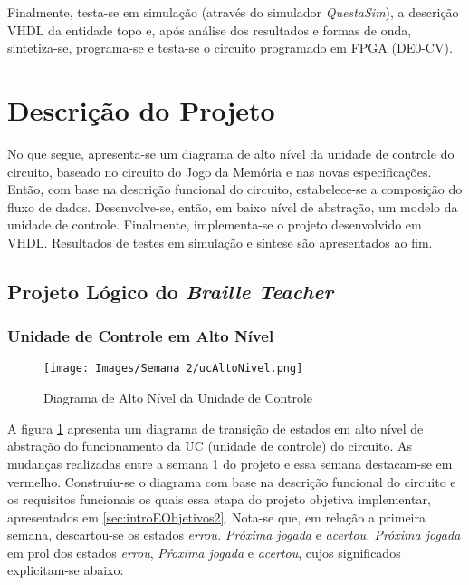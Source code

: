 \documentclass[amsmath,amssymb,floatfix]{report}
\begin{document}
Finalmente, testa-se em simulação (através do simulador \textit{QuestaSim}), a descrição VHDL da entidade topo e, após análise dos resultados e formas de onda, sintetiza-se, programa-se e testa-se o circuito programado em FPGA (DE0-CV).


\section{Descrição do Projeto}
\label{sec:descricaoDoProjeto2}

No que segue, apresenta-se um diagrama de alto nível da unidade de controle do circuito, baseado no circuito do Jogo da Memória e nas novas especificações. Então, com base na descrição funcional do circuito, estabelece-se a composição do fluxo de dados. Desenvolve-se, então, em baixo nível de abstração, um modelo da unidade de controle. Finalmente, implementa-se o projeto desenvolvido em VHDL. Resultados de testes em simulação e síntese são apresentados ao fim.

\subsection{Projeto Lógico do \textit{Braille Teacher}}
\label{subsec:projetoLogico2}

\subsubsection{Unidade de Controle em Alto Nível}
\label{subsubsec:ucAltoNivel2}

\begin{figure}[H]
    \centering
    \texttt{[image: Images/Semana 2/ucAltoNivel.png]}
    \caption{Diagrama de Alto Nível da Unidade de Controle}
    \label{fig:ucAltoNivel2}
\end{figure}

A figura \ref{fig:ucAltoNivel2} apresenta um diagrama de transição de estados em alto nível de abstração do funcionamento da UC (unidade de controle) do circuito. As mudanças realizadas entre a semana 1 do projeto e essa semana destacam-se em vermelho. Construiu-se o diagrama com base na descrição funcional do circuito e os requisitos funcionais os quais essa etapa do projeto objetiva implementar, apresentados em \ref{sec:introEObjetivos2}. Nota-se que, em relação a primeira semana, descartou-se os estados \textit{errou. Próxima jogada} e \textit{acertou. Próxima jogada} em prol dos estados \textit{errou}, \textit{Pŕoxima jogada} e \textit{acertou}, cujos significados explicitam-se abaixo:
\end{document}
